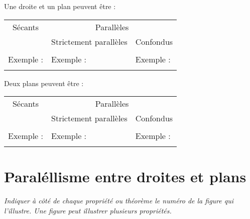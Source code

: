 \documentclass[10pt]{article}
\begin{document}
\begin{propriete}
  Une droite et un plan peuvent être :

  \begin{center}
  \begin{tabular}{|p{}|p{}|p{}|}
    \hline
    \multicolumn{1}{|c|}{Sécants} & \multicolumn{2}{c|}{Parallèles} \\
    & \multicolumn{1}{c|}{Strictement parallèles} & \multicolumn{1}{c|}{Confondus} \\
    \hline
    &&\\[2cm]
    \hline
    Exemple : & Exemple : & Exemple : \\[2cm]
    &&\\
    \hline
  \end{tabular}
\end{center}
\end{propriete}


\begin{propriete}
  Deux plans peuvent être :

  \begin{center}
  \begin{tabular}{|p{}|p{}|p{}|}
    \hline
    \multicolumn{1}{|c|}{Sécants} & \multicolumn{2}{c|}{Parallèles} \\
    & \multicolumn{1}{c|}{Strictement parallèles} & \multicolumn{1}{c|}{Confondus} \\
    \hline
    &&\\[2cm]
    \hline
    Exemple : & Exemple : & Exemple : \\[2cm]
    &&\\
    \hline
  \end{tabular}
\end{center}
\end{propriete}

\pagebreak
\section{Paraléllisme entre droites et plans}
\emph{\noindent Indiquer à côté de chaque propriété ou théorème le numéro de la figure qui l'illustre. Une figure peut illustrer plusieurs propriétés.}
\end{document}
